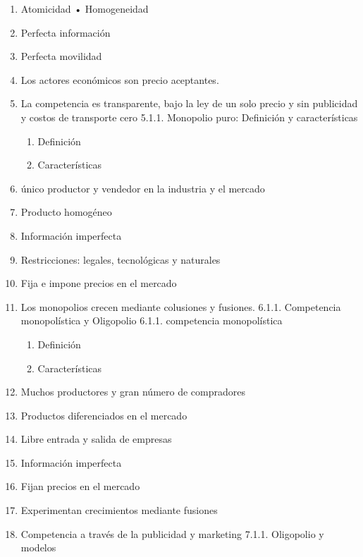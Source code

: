 \documentclass[
  a4paper,
]{article}
\providecommand{\tightlist}{%
  \setlength{\itemsep}{0pt}\setlength{\parskip}{0pt}}\usepackage{longtable,booktabs,array}
\begin{document}
\begin{enumerate}
\def\labelenumi{\arabic{enumi}.}
\item
  Atomicidad • Homogeneidad
\item
  Perfecta información
\item
  Perfecta movilidad
\item
  Los actores económicos son precio aceptantes.
\item
  La competencia es transparente, bajo la ley de un solo precio y sin
  publicidad y costos de transporte cero 5.1.1. Monopolio puro:
  Definición y características

  \begin{enumerate}
  \def\labelenumii{\Alph{enumii})}
  \tightlist
  \item
    Definición
  \item
    Características
  \end{enumerate}
\item
  único productor y vendedor en la industria y el mercado
\item
  Producto homogéneo
\item
  Información imperfecta
\item
  Restricciones: legales, tecnológicas y naturales
\item
  Fija e impone precios en el mercado
\item
  Los monopolios crecen mediante colusiones y fusiones. 6.1.1.
  Competencia monopolística y Oligopolio 6.1.1. competencia
  monopolística

  \begin{enumerate}
  \def\labelenumii{\Alph{enumii})}
  \tightlist
  \item
    Definición
  \item
    Características
  \end{enumerate}
\item
  Muchos productores y gran número de compradores
\item
  Productos diferenciados en el mercado
\item
  Libre entrada y salida de empresas
\item
  Información imperfecta
\item
  Fijan precios en el mercado
\item
  Experimentan crecimientos mediante fusiones
\item
  Competencia a través de la publicidad y marketing 7.1.1. Oligopolio y
  modelos


\end{enumerate}
\end{document}
